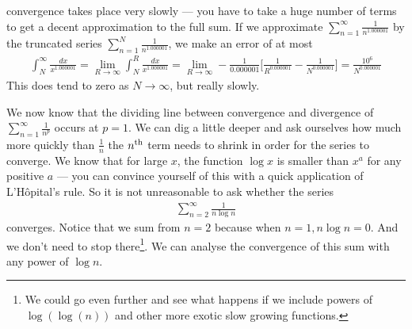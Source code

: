 \begin{eg}[The $p$ test:  $\sum\limits_{n=1}^\infty\frac{1}{n^p}$]
\begin{itemize}
convergence takes place very slowly --- you have to take a huge number
of terms to get a decent approximation to the full sum.
If we approximate $\sum_{n=1}^\infty\frac{1}{n^{1.000001}}$ by the
truncated series $\sum_{n=1}^N\frac{1}{n^{1.000001}}$, we make an error of
at most
\begin{align*}
\int_N^\infty \frac{dx}{x^{1.000001}}
= \lim_{R\rightarrow\infty} \int_N^R \frac{dx}{x^{1.000001}}
= \lim_{R\rightarrow\infty}- \frac{1}{0.000001}
          \Big[\frac{1}{R^{0.000001}}-\frac{1}{N^{0.000001}}\Big]
=\frac{10^6}{N^{0.000001}}
\end{align*}
This does tend to zero as $N\rightarrow\infty$, but really slowly.
\end{itemize}
\end{eg}
\goodbreak

We now know that the dividing line between convergence and divergence
of $\sum_{n=1}^\infty\frac{1}{n^p}$ occurs at $p=1$. We can dig
a little deeper and ask ourselves how much more quickly than
$\frac{1}{n}$ the $n^{\rm th}$ term
needs to shrink in order for the series to converge.
We know that for large $x$, the function $\log x$ is smaller than
$x^a$ for any positive $a$ --- you can convince yourself of this with
a quick application of L'H\^opital's rule. So it is not unreasonable
to ask whether the series
\begin{align*}
  \sum_{n=2}^\infty \frac{1}{n \log n}
\end{align*}
converges. Notice that we sum from $n=2$ because when $n=1, n\log n=0$.
And we don't need to stop there\footnote{We could go even further and see
what happens if we include powers of $\log(\log(n))$ and other more
exotic slow growing functions.}. We can analyse the convergence of
this sum with any power of $\log n$.


